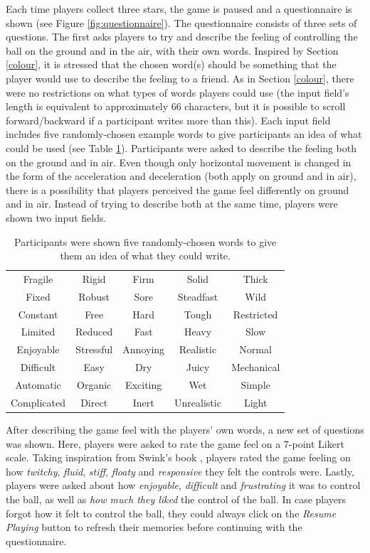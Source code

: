 Each time players collect three stars, the game is paused and a questionnaire is shown (see Figure \ref{fig:questionnaire}). The questionnaire consists of three sets of questions. The first asks players to try and describe the feeling of controlling the ball on the ground and in the air, with their own words. Inspired by Section \ref{colour}, it is stressed that the chosen word(s) should be something that the player would use to describe the feeling to a friend. As in Section \ref{colour}, there were no restrictions on what types of words players could use (the input field's length is equivalent to approximately 66 characters, but it is possible to scroll forward/backward if a participant writes more than this). Each input field includes five randomly-chosen example words to give participants an idea of what could be used (see Table \ref{table:wordsExamples}). Participants were asked to describe the feeling both on the ground and in air. Even though only horizontal movement is changed in the form of the acceleration and deceleration (both apply on ground and in air), there is a possibility that players perceived the game feel differently on ground and in air. Instead of trying to describe both at the same time, players were shown two input fields.

\begin{table} \centering
\scriptsize
\caption{Participants were shown five randomly-chosen words to give them an idea of what they could write.}
\label{table:wordsExamples}
\begin{tabular}{ccccc}
\toprule
Fragile & Rigid & Firm & Solid & Thick\\
Fixed & Robust & Sore & Steadfast & Wild\\
Constant & Free & Hard & Tough & Restricted\\
Limited & Reduced & Fast & Heavy & Slow\\
Enjoyable & Stressful & Annoying & Realistic & Normal\\
Difficult & Easy & Dry & Juicy & Mechanical\\
Automatic & Organic & Exciting & Wet & Simple\\
Complicated & Direct & Inert & Unrealistic & Light\\
\bottomrule
\end{tabular}
\end{table}

After describing the game feel with the players' own words, a new set of questions was shown. Here, players were asked to rate the game feel on a 7-point Likert scale. Taking inspiration from Swink's book \cite{swink}, players rated the game feeling on how \textit{twitchy}, \textit{fluid}, \textit{stiff}, \textit{floaty} and \textit{responsive} they felt the controls were. Lastly, players were asked about how \textit{enjoyable}, \textit{difficult} and \textit{frustrating} it was to control the ball, as well as \textit{how much they liked} the control of the ball. In case players forgot how it felt to control the ball, they could always click on the \textit{Resume Playing} button to refresh their memories before continuing with the questionnaire.

